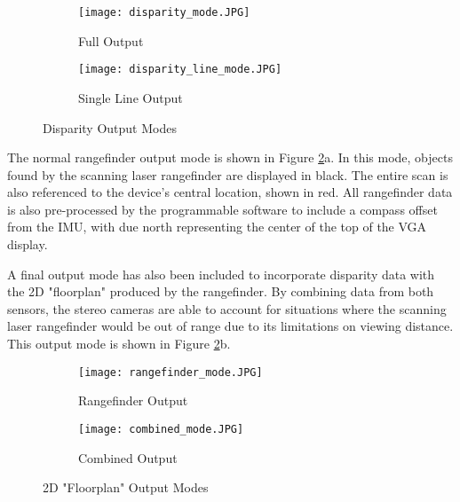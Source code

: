 \par
\begin{figure}[H] 
         \begin{subfigure}[h]{0.5\textwidth}
              \centerline{\texttt{[image: disparity\_mode.JPG]}}
             \caption{Full Output}
         \end{subfigure}
         \begin{subfigure}[h]{0.5\textwidth}
             \centerline{\texttt{[image: disparity\_line\_mode.JPG]}}
             \caption{Single Line Output}
         \end{subfigure}
\caption{Disparity Output Modes}
\label{disparityOutputs}
\end{figure}
\par
The normal rangefinder output mode is shown in Figure \ref{rangeOutputs}a. In this mode, objects found by the scanning laser rangefinder are displayed in black. The entire scan is also referenced to the device's central location, shown in red. All rangefinder data is also pre-processed by the programmable software to include a compass offset from the IMU, with due north representing the center of the top of the VGA display.
\par 
A final output mode has also been included to incorporate disparity data with the 2D "floorplan" produced by the rangefinder. By combining data from both sensors, the stereo cameras are able to account for situations where the scanning laser rangefinder would be out of range due to its limitations on viewing distance. This output mode is shown in Figure \ref{rangeOutputs}b.

\begin{figure}[H] 
         \begin{subfigure}[h]{0.5\textwidth}
              \centerline{\texttt{[image: rangefinder\_mode.JPG]}}
             \caption{Rangefinder Output}
         \end{subfigure}
         \begin{subfigure}[h]{0.5\textwidth}
             \centerline{\texttt{[image: combined\_mode.JPG]}}
             \caption{Combined Output}
         \end{subfigure}
\caption{2D "Floorplan" Output Modes}
\label{rangeOutputs}
\end{figure}
